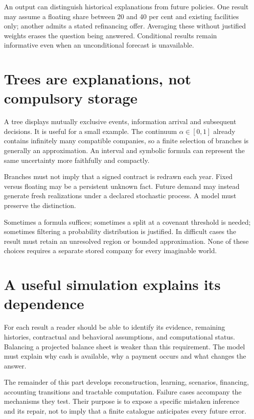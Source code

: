 An output can distinguish historical explanations from future policies. One result may assume a floating share between 20 and 40 per cent and existing facilities only; another admits a stated refinancing offer. Averaging these without justified weights erases the question being answered. Conditional results remain informative even when an unconditional forecast is unavailable.

\section{Trees are explanations, not compulsory storage}
A tree displays mutually exclusive events, information arrival and subsequent decisions. It is useful for a small example. The continuum $\alpha\in[0,1]$ already contains infinitely many compatible companies, so a finite selection of branches is generally an approximation. An interval and symbolic formula can represent the same uncertainty more faithfully and compactly.

Branches must not imply that a signed contract is redrawn each year. Fixed versus floating may be a persistent unknown fact. Future demand may instead generate fresh realizations under a declared stochastic process. A model must preserve the distinction.

Sometimes a formula suffices; sometimes a split at a covenant threshold is needed; sometimes filtering a probability distribution is justified. In difficult cases the result must retain an unresolved region or bounded approximation. None of these choices requires a separate stored company for every imaginable world.

\section{A useful simulation explains its dependence}
For each result a reader should be able to identify its evidence, remaining histories, contractual and behavioral assumptions, and computational status. Balancing a projected balance sheet is weaker than this requirement. The model must explain why cash is available, why a payment occurs and what changes the answer.

The remainder of this part develops reconstruction, learning, scenarios, financing, accounting transitions and tractable computation. Failure cases accompany the mechanisms they test. Their purpose is to expose a specific mistaken inference and its repair, not to imply that a finite catalogue anticipates every future error.
